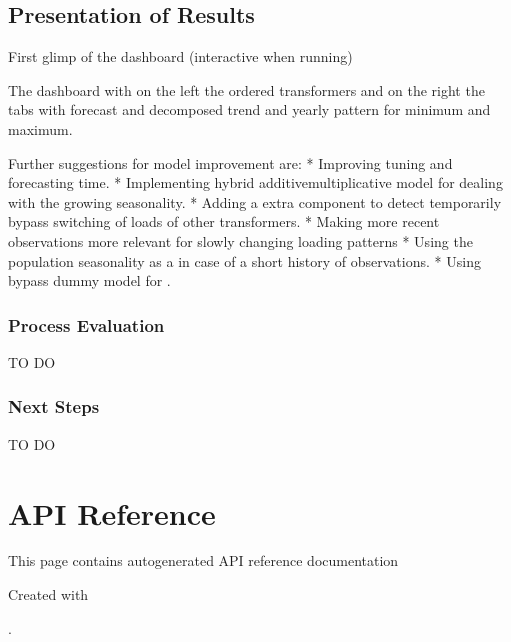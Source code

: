 \documentclass[letterpaper,10pt,english]{sphinxmanual}
\let\sphinxpxdimen\pdfpxdimen\else\newdimen\sphinxpxdimen
\begin{document}
\section{Presentation of Results}
\label{\detokenize{evaluation:presentation-of-results}}
First glimp of the dashboard (interactive when running)
\begin{quote}

\noindent{\hspace*{\fill}\sphinxincludegraphics[width=800\sphinxpxdimen]{{dashboard}.png}\hspace*{\fill}}
\end{quote}

The dashboard with on the left the ordered transformers and on the right the tabs with forecast and decomposed trend and yearly pattern for minimum and maximum.

Further suggestions for model improvement are:
* Improving tuning and forecasting time.
* Implementing hybrid additive\sphinxhyphen{}multiplicative model for dealing with the growing seasonality.
* Adding a extra component to detect temporarily bypass switching of loads of other transformers.
* Making more recent observations more relevant for slowly changing loading patterns
* Using the population seasonality as a  in case of a short history of observations.
* Using by\sphinxhyphen{}pass dummy model for .


\subsection{Process Evaluation}
\label{\detokenize{evaluation:process-evaluation}}
TO DO


\subsection{Next Steps}
\label{\detokenize{evaluation:next-steps}}
TO DO


\chapter{API Reference}
\label{\detokenize{autoapi/index:api-reference}}\label{\detokenize{autoapi/index::doc}}
This page contains auto\sphinxhyphen{}generated API reference documentation %
\begin{footnote}[1]\sphinxAtStartFootnote
Created with 
%
\end{footnote}.
\end{document}
